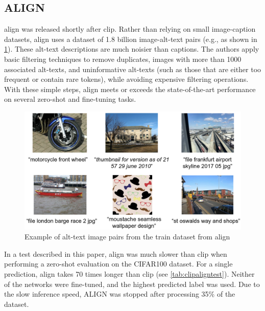         \subsection{ALIGN
            \label{section:align}}
        \acrfull{align} \cite{ALIGN} was released shortly after \acrshort{clip}. 
        Rather than relying on small image-caption datasets, \acrshort{align} uses a dataset of 1.8 billion image-alt-text pairs (e.g., as shown in \cref{fig:crossmodalnetworks:alignepairs}). 
        These alt-text descriptions are much noisier than captions. 
        The authors apply basic filtering techniques to remove duplicates, images with more than 1000 associated alt-texts, and uninformative alt-texts (such as those that are either too frequent or contain rare tokens), while avoiding expensive filtering operations. 
        With these simple steps, \acrshort{align} meets or exceeds the state-of-the-art performance on several zero-shot and fine-tuning tasks.
            
        \begin{figure}
            \centering
            \includegraphics[width=\textwidth]{Images/crossmodalnetworks/examplepicsalign.png}
            \caption{Example of alt-text image pairs from the train dataset from \acrshort{align}\cite{ALIGN}}
            \label{fig:crossmodalnetworks:alignepairs}
        \end{figure}

        In a test described in this paper, \acrshort{align} was much slower than \acrshort{clip} when performing a zero-shot evaluation on the CIFAR100 \cite{cifar100} dataset. 
        For a single prediction, \acrshort{align} takes 70 times longer than \acrshort{clip} (see \cref{tab:clipaligntest}). 
        Neither of the networks were fine-tuned, and the highest predicted label was used. 
        Due to the slow inference speed, ALIGN was stopped after processing 35\% of the dataset.

